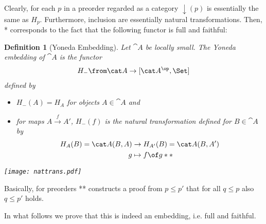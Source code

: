 \documentclass{article}
\newtheorem{definition}{Definition}
\begin{document}
Clearly, for each $p$ in a preorder regarded as a category $\downarrow(p)$ is essentially the same as $H_p$. Furthermore, inclusion are essentially natural transformations. Then, * corresponds to the fact that the following functor is full and faithful:

\begin{definition}[Yoneda Embedding]
  Let $\cat A$ be locally small. The \emph{Yoneda embedding} of $\cat A$ is the functor
  \begin{align*}
    H_-\from \cat A\to[\cat A^\op,\Set]
  \end{align*}
  defined by
  \begin{itemize}
  \item $H_-(A)=H_A$ for objects $A\in\cat A$ and
  \item for maps $A\xrightarrow{f}A'$, $H_-(f)$ is the natural transformation defined for $B\in \cat A$ by
    \begin{align*}
      H_A(B)=\cat A(B,A)&\to H_{A'}(B)=\cat A(B,A')\\
      g&\mapsto  f\of g **\\
    \end{align*}
  \end{itemize}
  \vspace{-0.8cm}
  \texttt{[image: nattrans.pdf]}
\end{definition}
Basically, for preorders ** constructs a proof from $p\leq p'$ that for all $q\leq p$ also $q\leq p'$ holds.

In what follows we prove that this is indeed an embedding, i.e. full and faithful.
\end{document}
